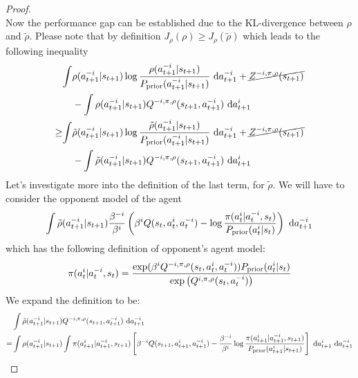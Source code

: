 \begin{proof}
\begin{equation*}
\end{equation*}
Now the performance gap can be established due to the KL-divergence between $\rho$ and $\tilde{\rho}$. Please note that by definition $J_{\rho}(\rho) \ge J_{\rho}(\tilde{\rho})$ which leads to the following inequality
\begin{equation*}
\begin{aligned}
&\begin{aligned}[t]
    \int &\rho(a^{-i}_{t+1} | s_{t+1}) \log\frac{\rho(a^{-i}_{t+1} | s_{t+1})}{P_{\text{prior}}(a^{-i}_{t+1} | s_{t+1})} \ \mathrm{d} a^{-i}_{t+1} + \cancel{Z^{-i, \pi, \rho}(s_{t+1})} \\
    &- \int \rho(a^{-i}_{t+1} | s_{t+1}) Q^{-i, \pi, \rho}(s_{t+1}, a^{-i}_{t+1}) \ \mathrm{d} a^{i}_{t+1}
\end{aligned} \\
\ge&\begin{aligned}[t]
    \int &\tilde{\rho}(a^{-i}_{t+1} | s_{t+1}) \log\frac{\tilde{\rho}(a^{-i}_{t+1} | s_{t+1})}{P_{\text{prior}}(a^{-i}_{t+1} | s_{t+1})} \ \mathrm{d} a^{-i}_{t+1} + \cancel{Z^{-i, \pi, \rho}(s_{t+1})} \\
    &- \int \tilde{\rho}(a^{-i}_{t+1} | s_{t+1}) Q^{-i, \pi, \rho}(s_{t+1}, a^{-i}_{t+1}) \ \mathrm{d} a^{i}_{t+1}
\end{aligned}
\end{aligned}
\end{equation*}
Let's investigate more into the definition of the last term, for $\tilde{\rho}$. We will have to consider the opponent model of the agent
\begin{equation}
    \int \tilde{\rho}(a^{-i}_{t+1} | s_{t+1}) \frac{\beta^{-i}}{\beta^{i}} \left( \beta^iQ(s_t, a^i_t, a^{-i}_t) - \log \frac{\pi(a^i_t | a^{-i}_t, s_t)}{P_{\text{prior}}(a^i_t | s_t)} \right) \ \mathrm{d} a^{-i}_{t+1}
\end{equation}
which has the following definition of opponent's agent model:
\begin{equation*}
    \pi(a^i_t | a^{-i}_t, s_t) = \frac{\exp(\beta^i Q^{-i, \pi, \rho}(s_t, a^i_t, a^{-i}_t)) P_{\text{prior}}(a^i_t | s_t)}{\exp\left( Q^{i, \pi, \rho}(s_t, a^{-i}_t) \right)}
\end{equation*}
We expand the definition to be:
\begin{equation*}
\begin{aligned}
    &\int \tilde{\rho}(a^{-i}_{t+1} | s_{t+1}) Q^{-i, \pi, \rho}(s_{t+1}, a^{-i}_{t+1}) \dby a^{-i}_{t+1} \\
    =& \int \rho(a^{-i}_{t+1} | s_{t+1}) \int \pi(a^i_{t+1} | a^{-i}_{t+1}, s_{t+1}) \brackb{\beta^{-i}Q(s_{t+1}, a^i_{t+1}, a^{-i}_{t+1}) - \frac{\beta^{-i}}{\beta^{i}}\log \frac{\pi(a^i_{t+1} | a^{-i}_{t+1}, s_{t+1})}{P_\prior(a^i_{t+1} | s_{t+1})}} \dby a^{i}_{t+1} \dby a^{-i}_{t+1} \\

\end{aligned}
\end{equation*}
\end{proof}
